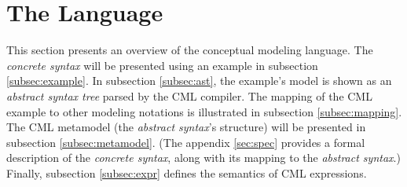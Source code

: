 \section{The Language}\label{sec:lang}
%
This section presents an overview of the conceptual modeling language.
The \emph{concrete syntax} will be presented using an example in subsection \ref{subsec:example}. 
In subsection \ref{subsec:ast},
the example's model is shown as an \emph{abstract syntax tree} parsed by the CML compiler.
The mapping of the CML example to other modeling notations is illustrated in subsection \ref{subsec:mapping}.
The CML metamodel (the \emph{abstract syntax}'s structure) will be presented in subsection \ref{subsec:metamodel}. 
(The appendix \ref{sec:spec} provides a formal description of the \emph{concrete syntax},
along with its mapping to the \emph{abstract syntax}.) Finally, subsection \ref{subsec:expr} defines the semantics of CML expressions.







